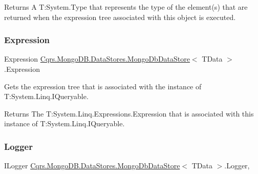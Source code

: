 \begin{DoxyReturn}{Returns}
A T\+:\+System.\+Type that represents the type of the element(s) that are returned when the expression tree associated with this object is executed. 
\end{DoxyReturn}
\mbox{\label{classCqrs_1_1MongoDB_1_1DataStores_1_1MongoDbDataStore_ade387c1d511dfad22ff7eb752fb842e5_ade387c1d511dfad22ff7eb752fb842e5}} 
\subsubsection{\texorpdfstring{Expression}{Expression}}
{\footnotesize\ttfamily Expression \hyperlink{classCqrs_1_1MongoDB_1_1DataStores_1_1MongoDbDataStore}{Cqrs.\+Mongo\+D\+B.\+Data\+Stores.\+Mongo\+Db\+Data\+Store}$<$ T\+Data $>$.Expression\hspace{0.3cm}{\ttfamily [get]}}



Gets the expression tree that is associated with the instance of T\+:\+System.\+Linq.\+I\+Queryable. 

\begin{DoxyReturn}{Returns}
The T\+:\+System.\+Linq.\+Expressions.\+Expression that is associated with this instance of T\+:\+System.\+Linq.\+I\+Queryable. 
\end{DoxyReturn}
\mbox{\label{classCqrs_1_1MongoDB_1_1DataStores_1_1MongoDbDataStore_a1258497689d7f866b2bc219cd8268b7d_a1258497689d7f866b2bc219cd8268b7d}} 
\subsubsection{\texorpdfstring{Logger}{Logger}}
{\footnotesize\ttfamily I\+Logger \hyperlink{classCqrs_1_1MongoDB_1_1DataStores_1_1MongoDbDataStore}{Cqrs.\+Mongo\+D\+B.\+Data\+Stores.\+Mongo\+Db\+Data\+Store}$<$ T\+Data $>$.Logger\hspace{0.3cm}{\ttfamily [get]}, {\ttfamily [protected]}}

